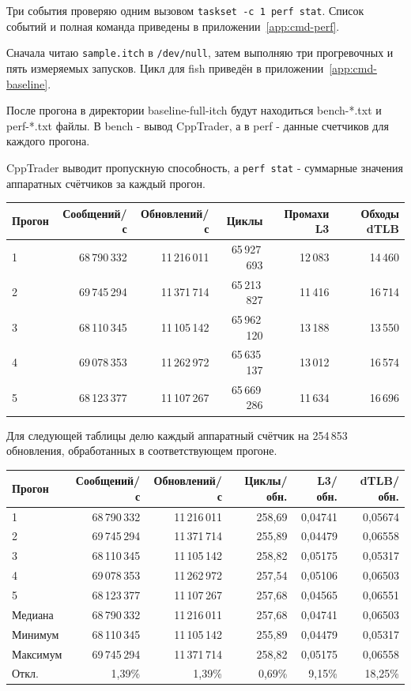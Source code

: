 \documentclass[a4paper,12pt]{article}
\begin{document}
Три события проверяю одним вызовом \texttt{taskset -c 1 perf stat}. Список событий и полная команда приведены в приложении~\ref{app:cmd-perf}.

Сначала читаю \texttt{sample.itch} в \texttt{/dev/null}, затем выполняю три прогревочных и пять измеряемых запусков. Цикл для fish приведён в приложении~\ref{app:cmd-baseline}.

После прогона в директории baseline-full-itch будут находиться bench-*.txt и
perf-*.txt файлы. В bench - вывод CppTrader, а в perf - данные счетчиков для
каждого прогона. 

CppTrader выводит пропускную способность, а \texttt{perf stat} -
суммарные значения аппаратных счётчиков за каждый прогон.
\begin{center}
\begin{tabular}{lrrrrr}
\toprule
Прогон & Сообщений/с & Обновлений/с & Циклы & Промахи L3 & Обходы dTLB \\
\midrule
1 & 68\,790\,332 & 11\,216\,011 & 65\,927\,693 & 12\,083 & 14\,460 \\
2 & 69\,745\,294 & 11\,371\,714 & 65\,213\,827 & 11\,416 & 16\,714 \\
3 & 68\,110\,345 & 11\,105\,142 & 65\,962\,120 & 13\,188 & 13\,550 \\
4 & 69\,078\,353 & 11\,262\,972 & 65\,635\,137 & 13\,012 & 16\,574 \\
5 & 68\,123\,377 & 11\,107\,267 & 65\,669\,286 & 11\,634 & 16\,696 \\
\bottomrule
\end{tabular}
\end{center}

Для следующей таблицы делю каждый аппаратный счётчик на 254\,853
обновления, обработанных в соответствующем прогоне.
\begin{center}
\begin{tabular}{lrrrrr}
\toprule
Прогон & Сообщений/с & Обновлений/с & Циклы/обн. & L3/обн. & dTLB/обн. \\
\midrule
1 & 68\,790\,332 & 11\,216\,011 & 258{,}69 & 0{,}04741 & 0{,}05674 \\
2 & 69\,745\,294 & 11\,371\,714 & 255{,}89 & 0{,}04479 & 0{,}06558 \\
3 & 68\,110\,345 & 11\,105\,142 & 258{,}82 & 0{,}05175 & 0{,}05317 \\
4 & 69\,078\,353 & 11\,262\,972 & 257{,}54 & 0{,}05106 & 0{,}06503 \\
5 & 68\,123\,377 & 11\,107\,267 & 257{,}68 & 0{,}04565 & 0{,}06551 \\
\midrule
Медиана & 68\,790\,332 & 11\,216\,011 & 257{,}68 & 0{,}04741 & 0{,}06503 \\
Минимум & 68\,110\,345 & 11\,105\,142 & 255{,}89 & 0{,}04479 & 0{,}05317 \\
Максимум & 69\,745\,294 & 11\,371\,714 & 258{,}82 & 0{,}05175 & 0{,}06558 \\
Откл. & 1{,}39\% & 1{,}39\% & 0{,}69\% & 9{,}15\% & 18{,}25\% \\
\bottomrule
\end{tabular}
\end{center}
\end{document}
